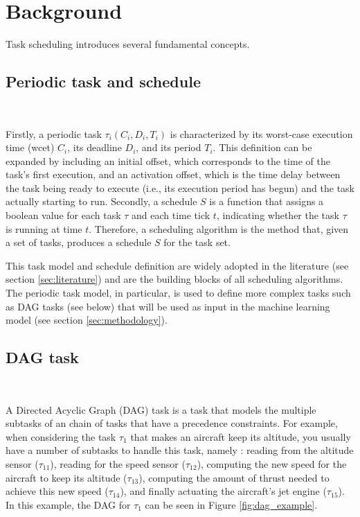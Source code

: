 
\section{Background}
\label{sec:bg}

Task scheduling introduces several fundamental concepts.

\subsection{Periodic task and schedule}
~

Firstly, a periodic task $\tau_i(C_i, D_i, T_i)$ is characterized 
by its worst-case execution time (wcet) $C_i$, its deadline $D_i$, and 
its period $T_i$. This definition can be expanded by including an 
initial offset, which corresponds to the time of the task's first 
execution, and an activation offset, which is the time delay between 
the task being ready to execute (i.e., its execution period has begun) 
and the task actually starting to run. Secondly, a schedule $S$ is a 
function that assigns a boolean value for each task $\tau$ and each 
time tick $t$, indicating whether the task $\tau$ is running at 
time $t$. Therefore, a scheduling algorithm is the method that, 
given a set of tasks, produces a schedule $S$ for the task set.

This task model and schedule definition are widely adopted in the literature (see section \ref{sec:literature}) 
and are the building blocks of all scheduling algorithms.
The periodic task model, in particular, is used to define more complex
tasks such as DAG tasks (see below) that will be used as input in the 
machine learning model (see section \ref{sec:methodology}).

\subsection{DAG task}
~

A Directed Acyclic Graph (DAG) task 
is a task that models the multiple subtasks of an chain of tasks
that have a precedence constraints.
For example, when considering the task $\tau_1$ that makes an 
aircraft keep its altitude, you usually have a number of subtasks
to handle this task, namely : reading from the altitude sensor ($\tau_{11}$),
reading for the speed sensor ($\tau_{12}$), computing the new speed for the aircraft
to keep its altitude ($\tau_13$), computing the amount of thrust needed to achieve
this new speed ($\tau_14$), and finally actuating the aircraft's jet engine ($\tau_15$).
In this example, the DAG for $\tau_1$ can be seen in Figure \ref{fig:dag_example}.


